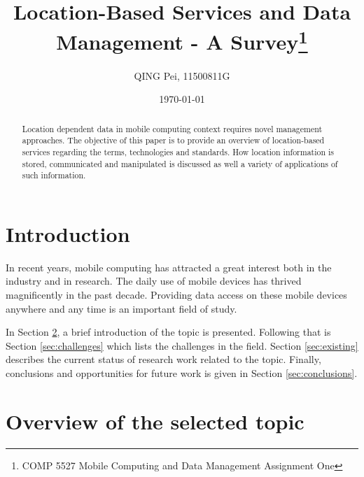 \documentclass[12pt,a4paper]{article}
\begin{document}
\title{Location-Based Services and Data Management - A Survey\footnote{COMP 5527 Mobile Computing and Data Management Assignment One}}
\author{QING Pei, 11500811G}
\date{\today}
% 

\maketitle

\begin{abstract}
Location dependent data in mobile computing context requires novel management approaches. The objective of this paper is to provide an overview of location-based services regarding the terms, technologies and standards. How location information is stored, communicated and manipulated is discussed as well a variety of applications of such information.
\end{abstract}


\section{Introduction} %
\label{sec:intro}
In recent years, mobile computing has attracted a great interest both in the industry and in research. The daily use of mobile devices has thrived magnificently in the past decade. Providing data access on these mobile devices anywhere and any time is an important field of study.

In Section \ref{sec:overview}, a brief introduction of the topic is presented. Following that is Section \ref{sec:challenges} which lists the challenges in the field. Section \ref{sec:existing} describes the current status of research work related to the topic. Finally, conclusions and opportunities for future work is given in Section \ref{sec:conclusions}.

\section{Overview of the selected topic} %
\label{sec:overview}
\end{document}
